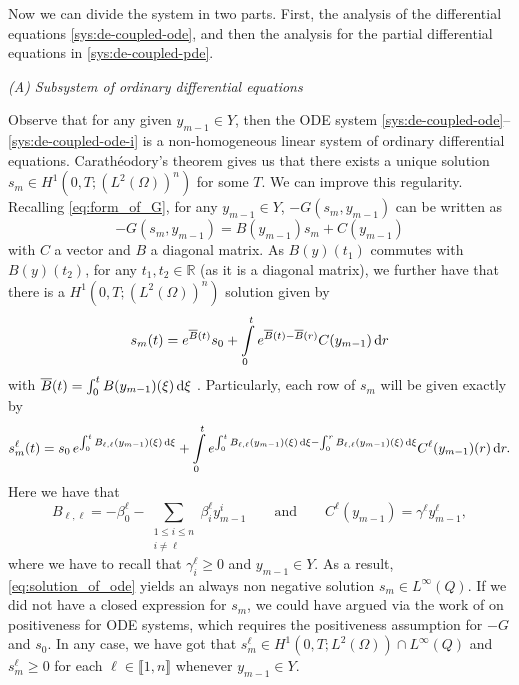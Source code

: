 \documentclass[11pt]{article}
\newcommand{\R}{\mathbb{R}}
\newcommand{\llb}{\llbracket}
\newcommand{\rrb}{\rrbracket}
\numberwithin{equation}{section}
\begin{document}
Now we can divide the system in two parts. First, the analysis of the differential equations \eqref{sys:de-coupled-ode}, and then the analysis for the partial differential equations in \eqref{sys:de-coupled-pde}.

\vspace{1\baselineskip}
\noindent\emph{(A) Subsystem of ordinary differential equations}
\vspace{0.5\baselineskip}

Observe that for any given \(y_{m-1} \in Y \), then the ODE system \eqref{sys:de-coupled-ode}--\eqref{sys:de-coupled-ode-i} is a non-homogeneous linear system of ordinary differential equations.
%
Carathéodory's theorem gives us that there exists a unique solution \(s_m \in H^{1} ( 0,T;(L^2(\Omega))^{n}  )\) for some \(T\).
	We can improve this regularity. Recalling \eqref{eq:form_of_G}, for any \(y_{m-1} \in Y\), \(-G(s_m,y_{m-1})\) can be written as
	\[
		-G(s_m,y_{m-1}) = B(y_{m-1})s_m + C(y_{m-1})
	\]
	with \(C\) a vector and \(B\) a diagonal matrix. As \(B(y)(t_1)\) commutes with \( B(y)(t_2)\), for any \(t_1, t_2 \in \R\) (as it is a diagonal matrix), we further have that there is a \(H^1 (0,T;(L^2(\Omega))^n )\) solution given by
	\[
		s_m(t) = e^{\overline{B}(t)} s_0 + \int\limits_0^t e^{\overline{B}(t)- \overline{B}(r)} C(y_{m-1}) \dif r
	\]
	with \( \overline{B}(t) = \int_0^t B(y_{m-1})(\xi) \dif \xi\) \cite{Schaeffer-2016}. 
	Particularly, each row of \(s_m\) will be given exactly by
	\begin{equation}
	\label{eq:solution_of_ode}
		s_m^\ell (t) = s_0 \, e^{ \int_0^t B_{\ell,\ell} (y_{m-1})(\xi) \dif \xi } + \int\limits_0^t 
		e^{ \int_0^t B_{\ell,\ell} (y_{m-1})(\xi) \dif \xi - \int_0^r  B_{\ell,\ell} (y_{m-1})(\xi) \dif \xi} 
		C^{\ell} (y_{m-1})(r) \dif r.
	\end{equation}
	Here we have that
	\[
		B_{\ell,\ell} = -\beta_0^\ell - \sum_{\substack{1\le i\le n\\ i\neq \ell}} \beta_i^\ell y_{m-1}^i 
		\qquad\text{and}\qquad
		C^\ell (y_{m-1}) = \gamma^\ell y_{m-1}^\ell,
	\]
	where we have to recall that \( \gamma_i^\ell \geq 0\) and \( y_{m-1} \in Y\). As a result, \eqref{eq:solution_of_ode} yields an always non negative solution \( s_m \in L^\infty (Q)\).
	If we did not have a closed expression for \(s_m\), we could have argued via the work of \cite{Horvath-1998} on positiveness for ODE systems, which requires the positiveness assumption for \(-G\) and \(s_0\). In any case, we have got that \( s_m^\ell \in H^1(0,T;L^2(\Omega) ) \cap L^\infty (Q)\) and \(s_m^\ell \geq 0\) for each \(\ell\in \llb 1,n\rrb\) whenever \(y_{m-1} \in Y\).
\end{document}
